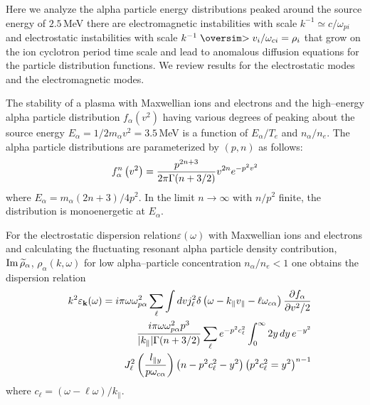\documentclass[a4paper,openany,12pt]{book}
\def\nms{\mathsurround=0pt}
\def\gtsim{\mathrel{\mathpalette\oversim>}} %
\def\oversim#1#2{\lower 2pt\vbox{\baselineskip 0pt \lineskip 1pt
    \ialign{$\nms#1\hfil##\hfil$\crcr#2\crcr\sim\crcr}}}
\begin{document}
Here we analyze the alpha particle energy distributions peaked around the source energy of $2.5\,$MeV there are electromagnetic instabilities with scale $k^{-1}\simeq c/\omega_{pi}$ and electrostatic instabilities with scale $k^{-1}\gtsim v_i/\omega_{ci}=\rho_i$ that grow on the ion cyclotron period time scale and lead to anomalous diffusion equations for the particle distribution functions. We review results for the electrostatic modes and the electromagnetic modes. 

The stability of a plasma with Maxwellian ions and electrons and the high--energy alpha particle distribution $f_\alpha(v^2)$ having various degrees of peaking about the source energy $E_\alpha = 1/2m_\alpha v^2 = 3.5\,$MeV is a function of $E_\alpha/T_e$ and $n_\alpha/n_e$. The alpha particle distributions are parameterized by $(p,n)$ as follows: 
\begin{equation}
f_\alpha^n\left(v^2\right)={p^{2n+3}\over 2\pi\Gamma(n+3/2)}v^{2n} e^{-p^2 v^2}\label{E7.1}
\end{equation}
where $E_\alpha=m_\alpha(2n+3)/4p^2$. In the limit $n\to\infty$ with $n/p^2$ finite, the distribution is monoenergetic at $E_\alpha$. 

For the electrostatic dispersion relation$\varepsilon(\omega)$ with Maxwellian ions and electrons and calculating the fluctuating resonant alpha particle density contribution, $\rm Im\,\widetilde\rho_\alpha$, $\rho_\alpha(k,\omega)$ for low alpha--particle concentration $n_\alpha/n_e < 1$ one obtains the dispersion relation 
\begin{eqnarray}
&&k^2\varepsilon_{\mathbf{k}}(\omega)=i\pi\omega\omega^2_{p\alpha}\sum_\ell\int dv j^2_\ell\delta\left(\omega-k_\| v_\|-\ell\omega_{c\alpha}\right){\partial f_\alpha\over\partial v^2/2}\nonumber\\
&&\mbox{}\quad {i\pi\omega\omega^2_{p\alpha} p^3\over|k_\||\Gamma(n+3/2)}\sum_\ell e^{-p^2 c^2_\ell}\int_0^\infty 2y\, dy\, e^{-y^2}\nonumber\\
&&J^2_\ell\left({l_{\|y}\over p\omega_{c\alpha}}\right)\left(n-p^2 c^2_\ell-y^2\right)\left(p^2 c^2_\ell=y^2\right)^{n-1}\label{E7.2}
\end{eqnarray}
where $c_\ell=(\omega-\ell\omega)/k_\|$.
\end{document}
